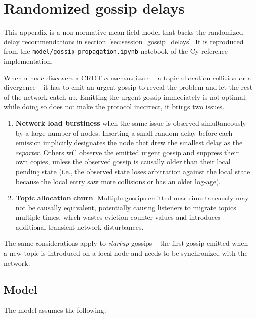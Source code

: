 \chapter{Randomized gossip delays}\label{sec:appendix_gossip_delays}

This appendix is a non-normative mean-field model that backs the
randomized-delay recommendations in section~\ref{sec:session_gossip_delays}.
It is reproduced from the \texttt{model/gossip\_propagation.ipynb} notebook
of the Cy reference implementation.

When a node discovers a CRDT consensus issue -- a topic allocation collision
or a divergence -- it has to emit an urgent gossip to reveal the problem and
let the rest of the network catch up. Emitting the urgent gossip immediately
is not optimal: while doing so does not make the protocol incorrect, it
brings two issues.

\begin{enumerate}
    \item \textbf{Network load burstiness} when the same issue is observed
    simultaneously by a large number of nodes. Inserting a small random
    delay before each emission implicitly designates the node that drew the
    smallest delay as the \emph{reporter}. Others will observe the emitted
    urgent gossip and suppress their own copies, unless the observed gossip
    is causally older than their local pending state (i.e., the observed
    state loses arbitration against the local state because the local entry
    saw more collisions or has an older log-age).

    \item \textbf{Topic allocation churn}. Multiple gossips emitted
    near-simultaneously may not be causally equivalent, potentially causing
    listeners to migrate topics multiple times, which wastes eviction
    counter values and introduces additional transient network
    disturbances.
\end{enumerate}

The same considerations apply to \emph{startup} gossips -- the first gossip
emitted when a new topic is introduced on a local node and needs to be
synchronized with the network.

\section{Model}\label{sec:appendix_gossip_delays_model}

The model assumes the following:

